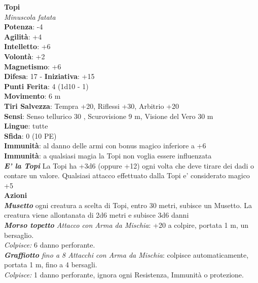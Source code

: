 \begin{multicols}{2}
\medskip\textbf{Topi}\\
\emph{Minuscola fatata}\\
\textbf{Potenza}: -4\\
\textbf{Agilità}: +4\\
\textbf{Intelletto}: +6\\
\textbf{Volontà}: +2\\
\textbf{Magnetismo}: +6\\
\textbf{Difesa}: 17 - \textbf{Iniziativa}: +15\\
\textbf{Punti Ferita}: 4 (1d10 - 1)\\
\textbf{Movimento}: 6 m\\
\textbf{Tiri Salvezza}: Tempra +20, Riflessi +30, Arbitrio +20 \\
\textbf{Sensi}: Senso tellurico 30 , Scurovisione 9 m, Visione del Vero 30 m\\
\textbf{Lingue}: tutte\\
\textbf{Sfida}: 0 (10 PE)\smallskip\\
\textbf{Immunità}: al danno delle armi con bonus magico inferiore a +6\\
\textbf{Immunità}: a qualsiasi magia la Topi non voglia essere influenzata\\
\emph{\textbf{E' la Topi}} La Topi ha +3d6 (oppure +12) ogni volta che deve tirare dei dadi o contare un valore. Qualsiasi attacco effettuato dalla Topi e' considerato magico +5\\
\smallskip\textbf{Azioni}\\
\emph{\textbf{Musetto}} ogni creatura a scelta di Topi, entro 30 metri, subisce un Musetto. La creatura viene allontanata di 2d6 metri e subisce 3d6 danni\\
\emph{\textbf{Morso topetto} Attacco con Arma da Mischia}: +20 a colpire, portata 1 m, un bersaglio.\\
\emph{Colpisce:} 6 danno perforante.\\
\emph{\textbf{Graffiotto} fino a 8 Attacchi con Arma da Mischia}: colpisce automaticamente, portata 1 m, fino a 4 bersagli.\\
\emph{Colpisce:} 1 danno perforante, ignora ogni Resistenza, Immunità o protezione.\\



\end{multicols}
